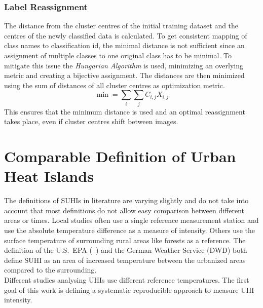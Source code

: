 \documentclass[12pt,a4paper, english,twoside]{scrartcl}
\begin{document}
    \subsubsection{Label Reassignment}\label{sec:labelassignment}
    The distance from the cluster centres of the initial training dataset and the centres of the newly classified data is calculated. 
    To get consistent mapping of class names to classification id, the minimal distance is not sufficient since an assignment of multiple classes to one original class has to be minimal. 
    To mitigate this issue the \textit{Hungarian Algorithm} is used, minimizing an overlying metric and creating a bijective assignment. 
    The distances are then minimized using the sum of distances of all cluster centres as optimization metric.
      \begin{equation}
        \min = \sum_{i}\sum_{j} C_{i,j}X_{i,j}
      \end{equation}
    This ensures that the minimum distance is used and an optimal reassignment takes place, even if cluster centres shift between images.
\newpage
\section{Comparable Definition of Urban Heat Islands}\label{sec:definition}
      The definitions of \glspl{SUHI} in literature are varying slightly and do not take into account that most definitions do not allow easy comparison between different areas or times.
      Local studies often use a single reference measurement station and use the absolute temperature difference as a measure of intensity.
      Others use the surface temperature of surrounding rural areas like forests as a reference.
      The definition of the U.S.~EPA (~\cite{EPA2008}) and the German Weather Service (\gls{DWD}) both define \gls{SUHI} as an area of increased temperature between the urbanized areas compared to the surrounding.\\ 
      Different studies analysing \glspl{UHI} use different reference temperatures.
      The first goal of this work is defining a systematic reproducible approach to measure \gls{UHI} intensity.
\end{document}
